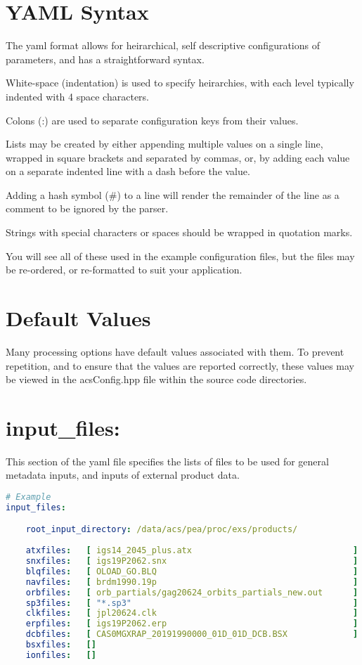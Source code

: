 \section{YAML Syntax}
The yaml format allows for heirarchical, self descriptive configurations of parameters, and has a straightforward syntax.

White-space (indentation) is used to specify heirarchies, with each level typically indented with 4 space characters.

Colons (:) are used to separate configuration keys from their values.

Lists may be created by either appending multiple values on a single line, wrapped in square brackets and separated by commas, or, by adding each value on a separate indented line with a dash before the value.

Adding a hash symbol (\#) to a line will render the remainder of the line as a comment to be ignored by the parser.

Strings with special characters or spaces should be wrapped in quotation marks.

You will see all of these used in the example configuration files, but the files may be re-ordered, or re-formatted to suit your application.

\section{Default Values}

Many processing options have default values associated with them. To prevent repetition, and to ensure that the values are reported correctly, these values may be viewed in the acsConfig.hpp file within the source code directories.

\section{input\_files:}

This section of the yaml file specifies the lists of files to be used for general metadata inputs, and inputs of external product data.

\begin{lstlisting}[language=yaml,caption=A typical input\_files section]
# Example
input_files:

	root_input_directory: /data/acs/pea/proc/exs/products/
	
	atxfiles:   [ igs14_2045_plus.atx                                ]
	snxfiles:   [ igs19P2062.snx                                     ]
	blqfiles:   [ OLOAD_GO.BLQ                                       ]  
	navfiles:   [ brdm1990.19p                                       ]  
	orbfiles:   [ orb_partials/gag20624_orbits_partials_new.out      ]  
	sp3files:   [ "*.sp3"                                            ]
	clkfiles:   [ jpl20624.clk                                       ]  
	erpfiles:   [ igs19P2062.erp                                     ]  
	dcbfiles:   [ CAS0MGXRAP_20191990000_01D_01D_DCB.BSX             ] 
	bsxfiles:   []
	ionfiles:   [] 
\end{lstlisting}

